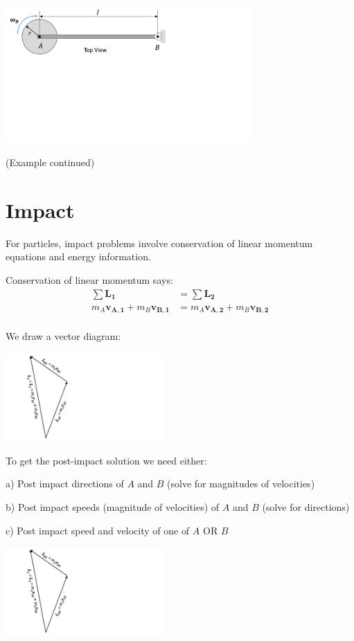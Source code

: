 \documentclass[12pt,letterpaper,twoside]{report}
\begin{document}
\includegraphics[trim={0cm 10cm 12cm 0cm},clip,width=0.7\textwidth, left]{Slide103}

\newpage

(Example continued)

\newpage
\section{Impact}
For particles, impact problems involve conservation of linear momentum equations and energy information.  

\vspace*{8\baselineskip}

Conservation of linear momentum says:
\begin{align*}
 \sum \bm{L_1} &= \sum \bm{L_2} \\
 m_A \bm{v_{A,1}} +  m_B \bm{v_{B,1}} &=  m_A \bm{v_{A,2}} +  m_B \bm{v_{B,2}}\\
\end{align*}

We draw a vector diagram:

\includegraphics[trim={0cm 0cm 20cm 0cm},clip,width=0.45\textwidth, center]{Slide104}

\newpage
To get the post-impact solution we need either:

a)	Post impact directions of $A$ and $B$ (solve for magnitudes of velocities)

b)	Post impact speeds (magnitude of velocities) of $A$ and $B$ (solve for directions)

c)	Post impact speed and velocity of one of $A$ OR $B$

\includegraphics[trim={0cm 0cm 20cm 0cm},clip,width=0.45\textwidth, center]{Slide104}
\end{document}
